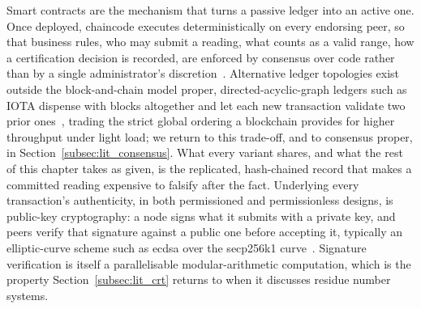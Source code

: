 \documentclass[12pt,a4paper,oneside]{book}
\begin{document}
Smart contracts are the mechanism that turns a passive ledger into an
active one. Once deployed, chaincode executes deterministically on every
endorsing peer, so that business rules, who may submit a reading, what
counts as a valid range, how a certification decision is recorded, are
enforced by consensus over code rather than by a single administrator's
discretion~\cite{krstic2020hyperledgerframeworks, tang2025applicationsblockchain}.
Alternative ledger topologies exist outside the block-and-chain model
proper, directed-acyclic-graph ledgers such as IOTA dispense with blocks
altogether and let each new transaction validate two prior
ones~\cite{anonndimprovedblockchain}, trading the strict global ordering a
blockchain provides for higher throughput under light load; we return to
this trade-off, and to consensus proper, in
Section~\ref{subsec:lit_consensus}. What every variant shares, and what
the rest of this chapter takes as given, is the replicated, hash-chained
record that makes a committed reading expensive to falsify after the fact.
Underlying every transaction's authenticity, in both permissioned and
permissionless designs, is public-key cryptography: a node signs what it
submits with a private key, and peers verify that signature against a
public one before accepting it, typically an elliptic-curve scheme such as
\gls{ecdsa} over the secp256k1 curve~\cite{anon2024securitysecp}. Signature
verification is itself a parallelisable modular-arithmetic computation,
which is the property Section~\ref{subsec:lit_crt} returns to when it
discusses residue number systems.

\label{subsec:lit_precision_ag}
\end{document}
